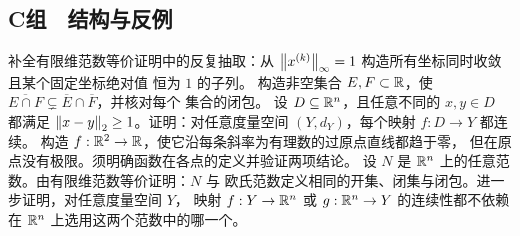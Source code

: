 \subsection*{C组　结构与反例}
\begin{enumerate}[label=\textbf{\thechapter.\arabic*.},resume]
 补全有限维范数等价证明中的反复抽取：从
 \(\left\lVert x^{(k)}\right\rVert_\infty=1\) 构造所有坐标同时收敛且某个固定坐标绝对值
 恒为 \(1\) 的子列。
 构造非空集合 \(E,F\subset\mathbb{R}\)，使
 \(\overline{E\cap F}\subsetneq\overline E\cap\overline F\)，并核对每个
 集合的闭包。
 设 \(D\subseteq\mathbb{R}^n\)，且任意不同的 \(x,y\in D\) 都满足
 \(\left\lVert x-y\right\rVert_2\ge1\)。证明：对任意度量空间 \((Y,d_Y)\)，每个映射
 \(f:D\to Y\) 都连续。
 构造 \(f:\mathbb{R}^2\to\mathbb{R}\)，使它沿每条斜率为有理数的过原点直线都趋于零，
 但在原点没有极限。须明确函数在各点的定义并验证两项结论。
 设 \(N\) 是 \(\mathbb{R}^n\) 上的任意范数。由有限维范数等价证明：\(N\) 与
 欧氏范数定义相同的开集、闭集与闭包。进一步证明，对任意度量空间 \(Y\)，
 映射 \(f:Y\to\mathbb{R}^n\) 或 \(g:\mathbb{R}^n\to Y\) 的连续性都不依赖在
 \(\mathbb{R}^n\) 上选用这两个范数中的哪一个。
\end{enumerate}
